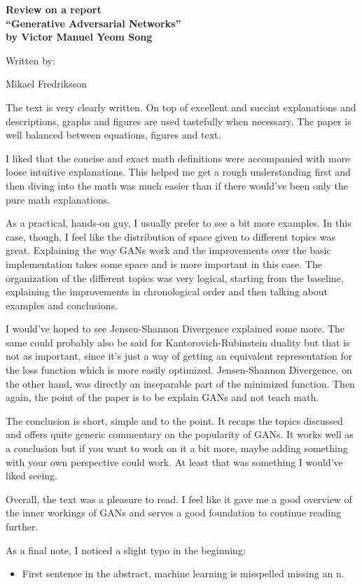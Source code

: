 \documentclass[a4paper,11pt]{article}
\begin{document}
\pagestyle{empty}


  \begin{center}
{\large {\bf 
Review on a report \\
``Generative Adversarial Networks'' \\
by Victor Manuel Yeom Song} \\

\bigskip

Written by: 

Mikael Fredriksson
 } 
\end{center}

The text is very clearly written. On top of excellent and succint explanations and 
descriptions, graphs and figures are used tastefully when necessary. The paper is 
well balanced between equations, figures and text.

I liked that the concise and exact math definitions were accompanied with more
loose intuitive explanations. This helped me get a rough understanding first and 
then diving into the math was much easier than if there would've been only the
pure math explanations.

As a practical, hands-on guy, I usually prefer to see a bit more examples. In this case,
though, I feel like the distribution of space given to different topics was great.
Explaining the way GANs work and the improvements over the basic implementation takes 
some space and is more important in this case. The organization of the different
topics was very logical, starting from the baseline, explaining the improvements
in chronological order and then talking about examples and conclusions.

I would've hoped to see Jensen-Shannon Divergence explained some more.
The same could probably also be said for Kantorovich-Rubinstein duality but that is
not as important, since it's just a way of getting an equivalent representation
for the loss function which is more easily optimized. Jensen-Shannon Divergence, on
the other hand, was directly an inseparable part of the minimized function. Then
again, the point of the paper is to be explain GANs and not teach math.

The conclusion is short, simple and to the point. It recaps the topics discussed and
offers quite generic commentary on the popularity of GANs. It works well as a conclusion
but if you want to work on it a bit more, maybe adding something with your own 
perspective could work. At least that was something I would've liked seeing.

Overall, the text was a pleasure to read. I feel like it gave me a good overview
of the inner workings of GANs and serves a good foundation to continue reading further.


As a final note, I noticed a slight typo in the beginning:

\begin{itemize}
	
	\item First sentence in the abstract, machine learning is misspelled missing an n.

\end{itemize}
\end{document}
